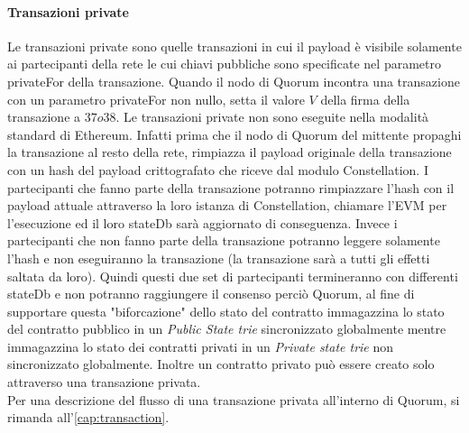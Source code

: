 \paragraph{Transazioni private}%
Le transazioni private sono quelle transazioni in cui il payload è visibile solamente ai partecipanti della rete le cui chiavi pubbliche sono specificate nel parametro privateFor della transazione. Quando il nodo di Quorum incontra una transazione con un parametro privateFor non nullo, setta il valore $V$ della firma della transazione a $37 o 38$. Le transazioni private non sono eseguite nella modalità standard di Ethereum. Infatti prima che il nodo di Quorum del mittente propaghi la transazione al resto della rete, rimpiazza il payload originale della transazione con un hash del payload crittografato che riceve dal modulo Constellation. I partecipanti che fanno parte della transazione potranno rimpiazzare l'hash con il payload attuale attraverso la loro istanza di Constellation, chiamare l'EVM per l'esecuzione ed il loro stateDb sarà aggiornato di conseguenza. Invece i partecipanti che non fanno parte della transazione potranno leggere solamente l'hash e non eseguiranno la transazione (la transazione sarà a tutti gli effetti saltata da loro). Quindi questi due set di partecipanti termineranno con differenti stateDb e non potranno raggiungere il consenso perciò Quorum, al fine di supportare questa "biforcazione" dello stato del contratto immagazzina lo stato del contratto pubblico in un \emph{Public State trie} sincronizzato globalmente mentre immagazzina lo stato dei contratti privati in un \emph{Private state trie} non sincronizzato globalmente. Inoltre un contratto privato può essere creato solo attraverso una transazione privata.\\
Per una descrizione del flusso di una transazione privata all'interno di Quorum, si rimanda all'\autoref{cap:transaction}.%
